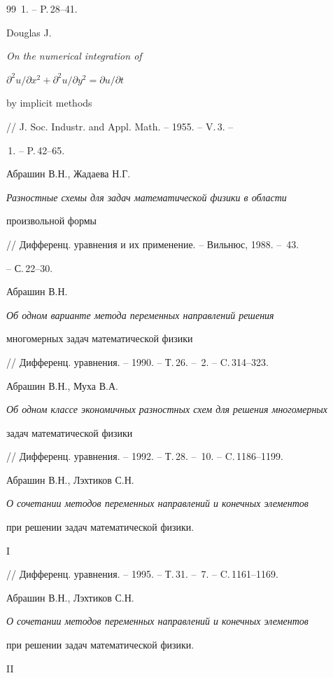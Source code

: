 \begin{thebibliography}{99}
\No\,1. -- P.\,28--41.




Douglas J.


{\it On the numerical integration of


$\partial^2u/\partial x^2+\partial^2u/\partial y^2=\partial u/\partial t$


by implicit methods}


// J. Soc. Industr. and Appl. Math. -- 1955. -- V.\,3. --


\No\,1. -- P.\,42--65.




Абрашин В.Н., Жадаева Н.Г.


{\it Разностные схемы для задач математической физики в области


произвольной формы}


// Дифференц. уравнения и их применение. -- Вильнюс, 1988. -- \No\,43.


-- С.\,22--30.




Абрашин В.Н.


{\it Об одном варианте метода переменных направлений решения


многомерных задач математической физики}


// Дифференц. уравнения. -- 1990. -- Т.\,26. -- \No\,2. -- C.\,314--323.




Абрашин В.Н., Муха В.А.


{\it Об одном классе экономичных разностных схем для решения многомерных


задач математической физики}


// Дифференц. уравнения. -- 1992. -- Т.\,28. -- \No\,10. -- C.\,1186--1199.




Абрашин В.Н., Лэхтиков С.Н.


{\it О сочетании методов переменных направлений и конечных элементов


при решении задач математической физики.} I


// Дифференц. уравнения. -- 1995. -- Т.\,31. -- \No\,7. -- C.\,1161--1169.




Абрашин В.Н., Лэхтиков С.Н.


{\it О сочетании методов переменных направлений и конечных элементов


при решении задач математической физики.} II



\end{thebibliography}
